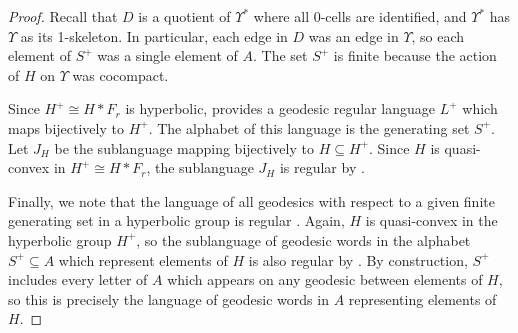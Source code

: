 \documentclass[10pt,a4paper]{amsart}
\begin{document}
\begin{proof}
        Recall that $D$ is a quotient of $\Upsilon^{*}$ where all 0-cells are identified, and $\Upsilon^{*}$ has $\Upsilon$ as its 1-skeleton. In particular, each edge in $D$ was an edge in $\Upsilon$, so each element of $S^{+}$ was a single element of $A$. The set $S^{+}$ is finite because the action of $H$ on $\Upsilon$ was cocompact.

        Since $H^{+} \cong H * F_r$ is hyperbolic, \cite[Theorem~11.27]{Cannon-regular-language} provides a geodesic regular language $L^{+}$ which maps bijectively to $H^{+}$. The alphabet of this language is the generating set $S^{+}$. Let $J_H$ be the sublanguage mapping bijectively to $H \subseteq H^{+}$. Since $H$ is quasi-convex in $H^{+} \cong H * F_r$, the sublanguage $J_H$ is regular by \cite[Theorem2.2]{Gersten-Short}.

        Finally, we note that the language of all geodesics with respect to a given finite generating set in a hyperbolic group is regular \cite{Cannon-regular-geodesics}. Again, $H$ is quasi-convex in the hyperbolic group $H^{+}$, so the sublanguage of geodesic words in the alphabet $S^{+} \subseteq A$ which represent elements of $H$ is also regular by \cite[Theorem~2.2]{Gersten-Short}. By construction, $S^{+}$ includes every letter of $A$ which appears on any geodesic between elements of $H$, so this is precisely the language of geodesic words in $A$ representing elements of $H$.
 \end{proof}
\end{document}
